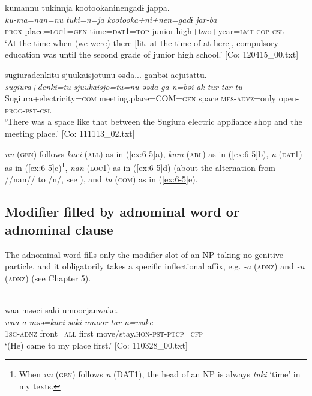 \ex
{\TM}
\glll kumannu  tukinnja  {\textbar}kootookaninen{\textbar}gadɨ jappa.\\
\textit{ku-ma=nan=nu}  \textit{tuki=n=ja}  \textit{kootooka+ni+nen=gadɨ}   \textit{jar-ba}\\
\textsc{prox}-place=\textsc{loc}1=\textsc{gen}  time=\textsc{dat}1=\textsc{top}  junior.high+two+year=\textsc{lmt}   \textsc{cop}-\textsc{csl}\\
\glt ‘At the time when (we were) there [lit. at the time of at here], compulsory education was until the second grade of junior high school.’ [Co: 120415\_00.txt]
\z

\ex
{\TM}
\glll {\textbar}sugiuradenki{\textbar}tu  {\textbar}sjuukaisjo{\textbar}tunu  əəda...  ganbəi  acjutattu.\\
\textit{sugiura+denki=tu}  \textit{sjuukaisjo=tu=nu}  \textit{əəda}  \textit{ga-n=bəi}  \textit{ak-tur-tar-tu}\\
Sugiura+electricity=\textsc{com}  meeting.place=COM=\textsc{gen}  space  \textsc{mes}-\textsc{advz}=only   open-\textsc{prog}-\textsc{pst}-\textsc{csl}\\
\glt ‘There was a space like that between the Sugiura electric appliance shop and the meeting place.’ [Co: 111113\_02.txt]
\z
\z

\textit{nu} (\textsc{gen}) follows \textit{kaci} (\textsc{all}) as in (\ref{ex:6-5}a), \textit{kara} (\textsc{abl}) as in (\ref{ex:6-5}b), \textit{n} (\textsc{dat}1) as in (\ref{ex:6-5}c)\footnote{When \textit{nu} (\textsc{gen}) follows \textit{n} (DAT1), the head of an NP is always \textit{tuki} ‘time’ in my texts.}, \textit{nan} (\textsc{loc}1) as in (\ref{ex:6-5}d) (about the alternation from //nan// to /n/, see ), and \textit{tu} (\textsc{com}) as in (\ref{ex:6-5}e).

\subsection{Modifier filled by adnominal word or adnominal clause}

The adnominal word fills only the modifier slot of an NP taking no genitive particle, and it obligatorily takes a specific inflectional affix, e.g. \textit{-a} (\textsc{adnz}) and \textit{-n} (\textsc{adnz}) (see Chapter 5).

\ea\label{ex:6-6}
\ea{}\\
{\US}
\glll  waa  məəci  saki  umoocjanwake.\\
\textit{waa-a}  \textit{məə=kaci}  \textit{saki}  \textit{umoor-tar-n=wake}\\
1\textsc{sg}-\textsc{adnz}  front=\textsc{all}  first  move/stay.\textsc{hon}-\textsc{pst}-\textsc{ptcp}=\textsc{cfp}\\
\glt ‘(He) came to my place first.’ [Co: 110328\_00.txt]
\z

